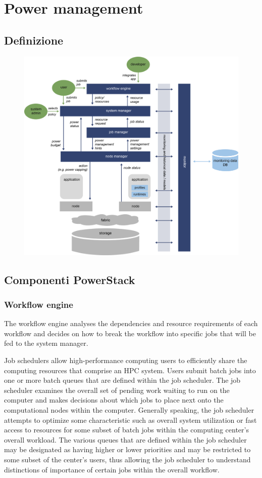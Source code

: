 \chapter{Power management}
\section{Definizione}
\begin{figure}
    \centering
    \includegraphics[width=\textwidth]{img/REGALE-Architecture-1536x1421.png}
\end{figure}
\section{Componenti PowerStack}
\subsection{Workflow engine}
The workflow engine analyses the dependencies and resource requirements of each workflow and decides on how to break the workflow into specific jobs that will be fed to the system manager. 

Job schedulers allow high-performance computing users to efficiently share the computing resources that comprise an HPC system. Users submit batch jobs into one or more batch queues that are defined within the job scheduler. The job scheduler examines the overall set of pending work waiting to run on the computer and makes decisions about which jobs to place next onto the computational nodes within the computer. Generally speaking, the job scheduler attempts to optimize some characteristic such as overall system utilization or fast access to resources for some subset of batch jobs within the computing center's overall workload. The various queues that are defined within the job scheduler may be designated as having higher or lower priorities and may be restricted to some subset of the center's users, thus allowing the job scheduler to understand distinctions of importance of certain jobs within the overall workflow.


